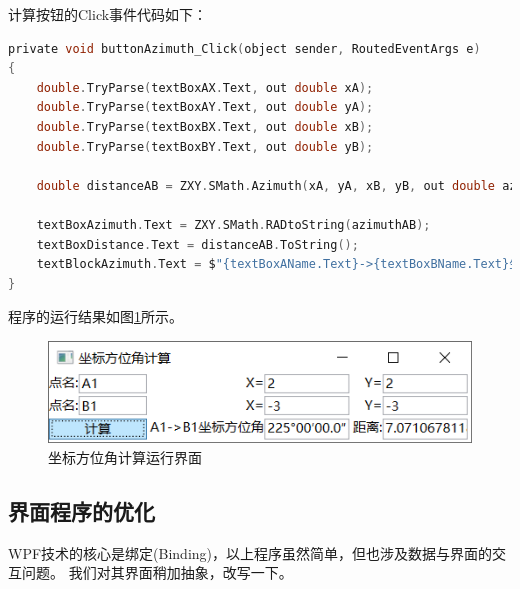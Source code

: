 计算按钮的Click事件代码如下：
\begin{lstlisting}[language=C]
private void buttonAzimuth_Click(object sender, RoutedEventArgs e)
{
    double.TryParse(textBoxAX.Text, out double xA);
    double.TryParse(textBoxAY.Text, out double yA);
    double.TryParse(textBoxBX.Text, out double xB);
    double.TryParse(textBoxBY.Text, out double yB);

    double distanceAB = ZXY.SMath.Azimuth(xA, yA, xB, yB, out double azimuthAB);

    textBoxAzimuth.Text = ZXY.SMath.RADtoString(azimuthAB);
    textBoxDistance.Text = distanceAB.ToString();
    textBlockAzimuth.Text = $"{textBoxAName.Text}->{textBoxBName.Text}坐标方位角:";
}
\end{lstlisting}

程序的运行结果如图\ref{fig:AzimuthUI2}所示。

\begin{figure}[htbp]
    \centering
    \includegraphics[scale=1]{surveybase/AzimuthUI2.png}
    \caption{坐标方位角计算运行界面}
    \label{fig:AzimuthUI2}
\end{figure}

\subsection{界面程序的优化}

WPF技术的核心是绑定(Binding)，以上程序虽然简单，但也涉及数据与界面的交互问题。
我们对其界面稍加抽象，改写一下。

